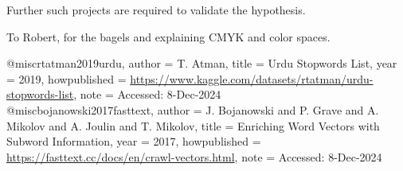 \documentclass[sigconf]{acmart}
\begin{document}
Further such projects are required to validate the hypothesis.



\begin{acks}
To Robert, for the bagels and explaining CMYK and color spaces.
\end{acks}





\appendix
@misc{rtatman2019urdu,
    author = {T. Atman},
    title = {Urdu Stopwords List},
    year = {2019},
    howpublished = {\url{https://www.kaggle.com/datasets/rtatman/urdu-stopwords-list}},
    note = {Accessed: 8-Dec-2024}
}\\

@misc{bojanowski2017fasttext,
    author = {J. Bojanowski and P. Grave and A. Mikolov and A. Joulin and T. Mikolov},
    title = {Enriching Word Vectors with Subword Information},
    year = {2017},
    howpublished = {\url{https://fasttext.cc/docs/en/crawl-vectors.html}},
    note = {Accessed: 8-Dec-2024}
}
\end{document}
